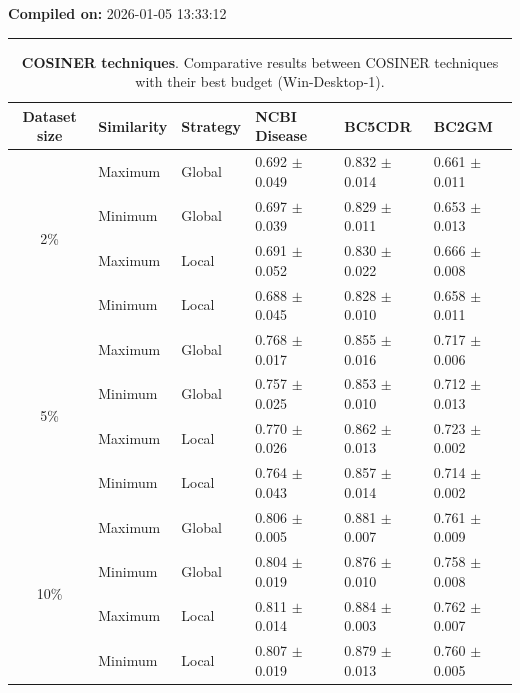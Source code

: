 \documentclass{article}
\begin{document}
    \noindent
    \textbf{Compiled on:} 2026-01-05 13:33:12
    \par\medskip
    \hrule
    \medskip

    \FloatBarrier

\begin{table}
    \footnotesize
    \centering
    \caption{\textbf{COSINER techniques}. Comparative results between COSINER techniques with their best budget (Win-Desktop-1).}
    \begin{tabular}{@{}cp{}p{}lll@{}}
    \toprule
    \textbf{Dataset size} & \textbf{Similarity} & \textbf{Strategy} &
    \textbf{NCBI Disease} & \textbf{BC5CDR} & \textbf{BC2GM} \\ \midrule
    \multirow{4}{*}{2\%} & Maximum & Global & 0.692 $\pm$ 0.049 & 0.832 $\pm$ 0.014 & 0.661 $\pm$ 0.011 \\
 & Minimum & Global & 0.697 $\pm$ 0.039 & 0.829 $\pm$ 0.011 & 0.653 $\pm$ 0.013 \\
 & Maximum & Local & 0.691 $\pm$ 0.052 & 0.830 $\pm$ 0.022 & 0.666 $\pm$ 0.008 \\
 & Minimum & Local & 0.688 $\pm$ 0.045 & 0.828 $\pm$ 0.010 & 0.658 $\pm$ 0.011 \\
\midrule
\multirow{4}{*}{5\%} & Maximum & Global & 0.768 $\pm$ 0.017 & 0.855 $\pm$ 0.016 & 0.717 $\pm$ 0.006 \\
 & Minimum & Global & 0.757 $\pm$ 0.025 & 0.853 $\pm$ 0.010 & 0.712 $\pm$ 0.013 \\
 & Maximum & Local & 0.770 $\pm$ 0.026 & 0.862 $\pm$ 0.013 & 0.723 $\pm$ 0.002 \\
 & Minimum & Local & 0.764 $\pm$ 0.043 & 0.857 $\pm$ 0.014 & 0.714 $\pm$ 0.002 \\
\midrule
\multirow{4}{*}{10\%} & Maximum & Global & 0.806 $\pm$ 0.005 & 0.881 $\pm$ 0.007 & 0.761 $\pm$ 0.009 \\
 & Minimum & Global & 0.804 $\pm$ 0.019 & 0.876 $\pm$ 0.010 & 0.758 $\pm$ 0.008 \\
 & Maximum & Local & 0.811 $\pm$ 0.014 & 0.884 $\pm$ 0.003 & 0.762 $\pm$ 0.007 \\
 & Minimum & Local & 0.807 $\pm$ 0.019 & 0.879 $\pm$ 0.013 & 0.760 $\pm$ 0.005 \\
    \bottomrule
    \end{tabular}
    \label{tab:methods_comp}
    \end{table}
\end{document}
